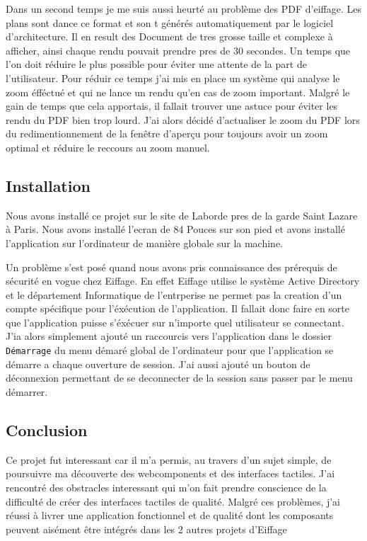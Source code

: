 Dans un second temps je me suis aussi heurté au problème des PDF d'eiffage.
Les plans sont dance ce format et son t générés automatiquement par le logiciel d'architecture.
Il en result des Document de tres grosse taille et complexe à afficher, ainsi chaque rendu pouvait prendre pres de 30 secondes.
Un temps que l'on doit réduire le plus possible pour éviter une attente de la part de l'utilisateur.
Pour réduir ce temps j'ai mis en place un système qui analyse le zoom éfféctué et qui ne lance un rendu qu'en cas de zoom important.
Malgré le gain de temps que cela apportais, il fallait trouver une astuce pour éviter les rendu du PDF bien trop lourd.
J'ai alors décidé d'actualiser le zoom du PDF lors du redimentionnement de la fenêtre d'aperçu pour toujours avoir un zoom optimal et réduire le reccours au zoom manuel.

\subsection{Installation}

Nous avons installé ce projet sur le site de Laborde pres de la garde Saint Lazare à Paris.
Nous avons installé l'ecran de 84 Pouces sur son pied et avons installé l'application sur l'ordinateur de manière globale sur la machine.

Un problème s'est posé quand nous avons pris connaissance des prérequis de sécurité en vogue chez Eiffage.
En effet Eiffage utilise le système Active Directory et le département Informatique de l'entrperise ne permet pas la creation d'un compte spécifique pour l'éxécution de l'application.
Il fallait donc faire en sorte que l'application puisse s'éxécuer sur n'importe quel utilisateur se connectant.
J'ia alors simplement ajouté un raccourcis vers l'application dans le dossier \texttt{Démarrage} du menu démaré global de l'ordinateur pour que l'application se démarre a chaque ouverture de session.
J'ai aussi ajouté un bouton de déconnexion permettant de se deconnecter de la session sans passer par le menu démarrer.

\subsection{Conclusion}

Ce projet fut interessant car il m'a permis, au travers d'un sujet simple, de poursuivre ma découverte des webcomponents et des interfaces tactiles.
J'ai rencontré des obstracles interessant qui m'on fait prendre conscience de la difficulté de créer des interfaces tactiles de qualité.
Malgré ces problèmes, j'ai réussi à livrer une application fonctionnel et de qualité dont les composants peuvent aisément être intégrés dans les 2 autres projets d'Eiffage